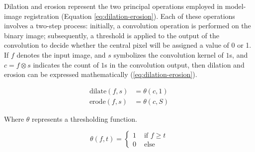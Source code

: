 Dilation and erosion represent the two principal operations employed in model-image registration (Equation \ref{eq:dilation-erosion}).
Each of these operations involves a two-step process: initially, a convolution operation is performed on the binary image; subsequently, a threshold is applied to the output of the convolution to decide whether the central pixel will be assigned a value of 0 or 1.
If $f$ denotes the input image, and $s$ symbolizes the convolution kernel of $1$s, and $c=f\otimes s$ indicates the count of $1$s in the convolution output, then dilation and erosion can be expressed mathematically (\cref{eq:dilation-erosion}).

\begin{equation}
    \begin{aligned}
        \text{dilate}(f,s) &= \theta(c,1) \\
        \text{erode}(f,s) &= \theta(c,S) 
    \end{aligned}
    \label{eq:dilation-erosion}
\end{equation}

Where $\theta$ represents a thresholding function.

\begin{equation}
    \theta (f,t) = \begin{cases}
        1 &\text{ if } f\ge t \\
        0 &\text{ else}
    \end{cases}
\end{equation}

